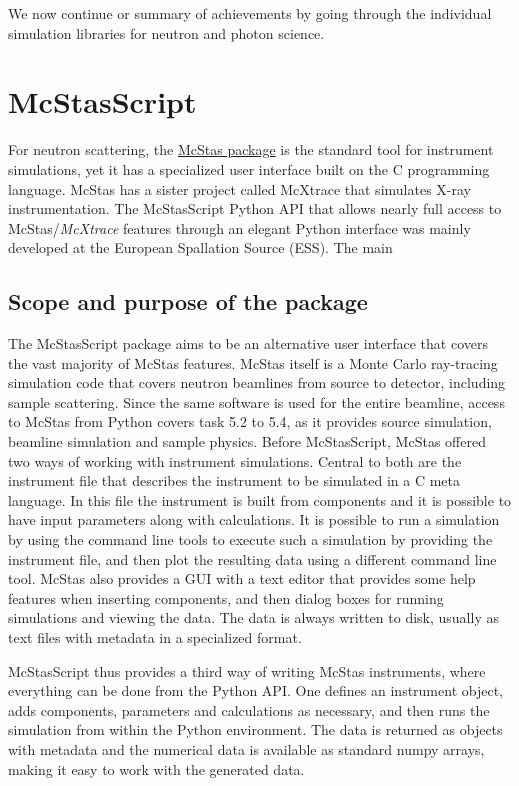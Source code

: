 \documentclass[11pt, a4paper]{article}
\begin{document}
We now continue or summary of achievements by going through the individual
simulation libraries for neutron and photon science.

\section{McStasScript\label{sec:mcstasscript}}

For neutron scattering, the \href{https://www.mcstas.org}{McStas package} is the standard tool for instrument simulations, yet it has a
specialized user interface built on the C programming language. McStas has a
sister project called McXtrace that simulates X-ray instrumentation.
The McStasScript Python API that allows
nearly full access to McStas/\textit{McXtrace} features through an elegant Python
interface was mainly developed at the European Spallation Source (ESS). The main


\subsection{Scope and purpose of the package}
The McStasScript package aims to be an alternative user interface that covers the vast majority of McStas features. McStas itself is a Monte Carlo ray-tracing simulation code that covers neutron beamlines from source to detector, including sample scattering. Since the same software is used for the entire beamline, access to McStas from Python covers task 5.2 to 5.4, as it provides source simulation, beamline simulation and sample physics. Before McStasScript, McStas offered two ways of working with instrument simulations. Central to both are the instrument file that describes the instrument to be simulated in a C meta language. In this file the instrument is built from components and it is possible to have input parameters along with calculations. It is possible to run a simulation by using the command line tools to execute such a simulation by providing the instrument file, and then plot the resulting data using a different command line tool. McStas also provides a GUI with a text editor that provides some help features when inserting components, and then dialog boxes for running simulations and viewing the data. The data is always written to disk, usually as text files with metadata in a specialized format.

McStasScript thus provides a third way of writing McStas instruments, where everything can be done from the Python API. One defines an instrument object, adds components, parameters and calculations as necessary, and then runs the simulation from within the Python environment. The data is returned as objects with metadata and the numerical data is available as standard numpy arrays, making it easy to work with the generated data.
\end{document}
